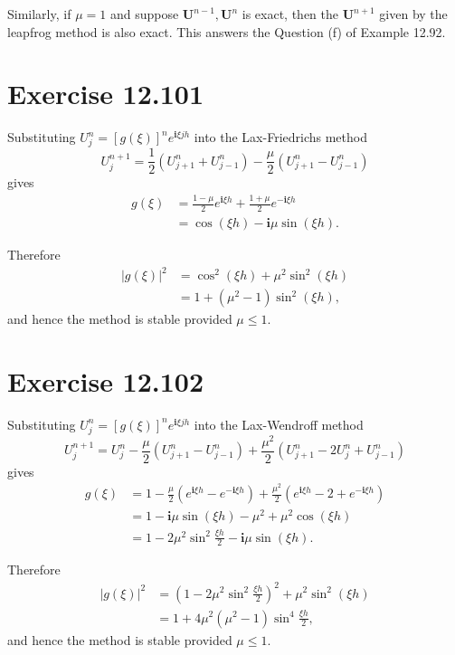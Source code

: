 \documentclass[twocolumn,10pt]{article}
\begin{document}
Similarly, if $\mu=1$ and suppose $\mathbf{U}^{n-1}, \mathbf{U}^n$ is exact, then the $\mathbf{U}^{n+1}$ given by the leapfrog method is also exact. This answers the Question (f) of Example 12.92.

\section*{\large Exercise 12.101}

Substituting $U_j^n=[g(\xi)]^ne^{\mathbf{i}\xi jh}$ into the Lax-Friedrichs method
\begin{equation*}
    U_j^{n+1}=\frac{1}{2}(U_{j+1}^n+U_{j-1}^n)-\frac{\mu}{2}(U_{j+1}^n-U_{j-1}^n)
\end{equation*}
gives
\begin{align*}
    g(\xi)&=\frac{1-\mu}{2}e^{\mathbf{i}\xi h} + \frac{1+\mu}{2}e^{-\mathbf{i}\xi h}\\
    &= \cos(\xi h) - \mathbf{i}\mu \sin(\xi h).
\end{align*}

Therefore
\begin{align*}
    |g(\xi)|^2&= \cos^2(\xi h) + \mu^2 \sin^2(\xi h)\\
    &= 1+(\mu^2-1)\sin^2(\xi h),
\end{align*}
and hence the method is stable provided $\mu\leq 1$.

\section*{\large Exercise 12.102}

Substituting $U_j^n=[g(\xi)]^ne^{\mathbf{i}\xi jh}$ into the Lax-Wendroff method
\begin{equation*}
    U_j^{n+1}=U_j^n - \frac{\mu}{2}(U_{j+1}^n-U_{j-1}^n) + \frac{\mu^2}{2}(U_{j+1}^n-2U_j^n+U_{j-1}^n)
\end{equation*}
gives
\begin{align*}
    g(\xi)&=1 - \frac{\mu}{2}(e^{\mathbf{i}\xi h}-e^{-\mathbf{i}\xi h}) + \frac{\mu^2}{2}(e^{\mathbf{i}\xi h}-2+e^{-\mathbf{i}\xi h})\\
    &= 1-\mathbf{i}\mu \sin(\xi h)-\mu^2+\mu^2\cos(\xi h)\\
    &= 1-2\mu^2\sin^2\frac{\xi h}{2} -\mathbf{i}\mu \sin(\xi h).
\end{align*}

Therefore
\begin{align*}
    |g(\xi)|^2&= \left(1-2\mu^2\sin^2\frac{\xi h}{2}\right)^2 + \mu^2 \sin^2(\xi h)\\
    &= 1+4\mu^2(\mu^2-1)\sin^4\frac{\xi h}{2},
\end{align*}
and hence the method is stable provided $\mu\leq 1$.
\end{document}

